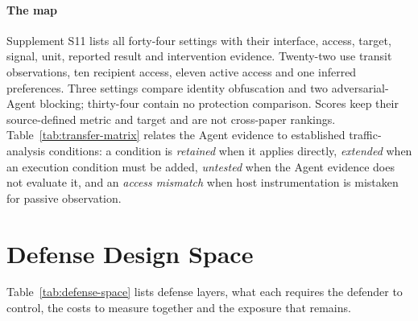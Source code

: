 \paragraph{The map}
Supplement S11 lists all forty-four settings with their interface, access, target, signal, unit, reported result and intervention evidence. Twenty-two use transit observations, ten recipient access, eleven active access and one inferred preferences. Three settings compare identity obfuscation and two adversarial-Agent blocking; thirty-four contain no protection comparison. Scores keep their source-defined metric and target and are not cross-paper rankings. Table~\ref{tab:transfer-matrix} relates the Agent evidence to established traffic-analysis conditions: a condition is \emph{retained} when it applies directly, \emph{extended} when an execution condition must be added, \emph{untested} when the Agent evidence does not evaluate it, and an \emph{access mismatch} when host instrumentation is mistaken for passive observation.




\section{Defense Design Space}\label{app:defense}
Table~\ref{tab:defense-space} lists defense layers, what each requires the defender to control, the costs to measure together and the exposure that remains.


